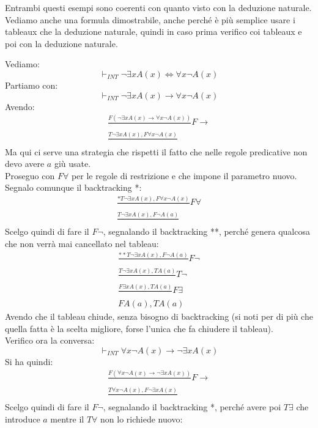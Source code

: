 \documentclass[a4paper,12pt, oneside]{book}
\begin{document}
Entrambi questi esempi sono coerenti con quanto visto con la deduzione
naturale.\\
Vediamo anche una formula dimostrabile, anche perché è più semplice usare i
tableaux che la deduzione naturale, quindi in caso prima verifico coi tableaux e
poi con la deduzione naturale.
\begin{esempio}
  Vediamo:
  \[\vdash_{INT} \neg\exists x A(x)\iff \forall x\neg A(x)\]
  Partiamo con:
  \[\vdash_{INT} \neg\exists x A(x)\to \forall x\neg A(x)\]
  Avendo:
  \begin{gather*}
    \frac{F(\neg\exists x A(x)\to \forall x\neg A(x))}{}F\to\\
    \frac{T\neg\exists xA(x), F\forall x\neg A(x)}{}
  \end{gather*}
  Ma qui ci serve una strategia che rispetti il fatto che nelle regole
  predicative non devo avere $a$ giù usate.\\
  Proseguo con $F\forall$ per le regole di restrizione e che impone il parametro
  nuovo. Segnalo comunque il backtracking *:
  \begin{gather*}
    \frac{*T\neg\exists xA(x), F\forall x\neg A(x)}{}F\forall\\
    \frac{T\neg \exists x A(x), F\neg A(a)}{}
  \end{gather*}
  Scelgo quindi di fare il $F\neg$, segnalando il backtracking **, perché genera
  qualcosa che non verrà mai cancellato nel tableau:
  \begin{gather*}
    \frac{**T\neg \exists x A(x), F\neg A(a)}{}F\neg\\
    \frac{T\neg \exists x A(x), T A(a)}{}T\neg\\
    \frac{F\exists xA(x), TA(a)}{}F\exists\\
    FA(a), TA(a)
  \end{gather*}
  Avendo che il tableau chiude, senza bisogno di backtracking (si noti per di
  più che quella fatta è la scelta migliore, forse l'unica che fa chiudere il
  tableau).\\ 
  Verifico ora la conversa:
  \[\vdash_{INT} \forall x\neg A(x)\to \neg\exists x A(x) \]
  Si ha quindi:
  \begin{gather*}
    \frac{F(\forall x\neg A(x)\to \neg\exists x A(x))}{}F\to\\
    \frac{T\forall x\neg A(x), F\neg\exists x A(x)}{}
  \end{gather*}
  Scelgo quindi di fare il $F\neg$, segnalando il backtracking *, perché avere
  poi $T\exists$ che introduce $a$ mentre il $T\forall$ non lo richiede nuovo:

\end{esempio}
\end{document}
